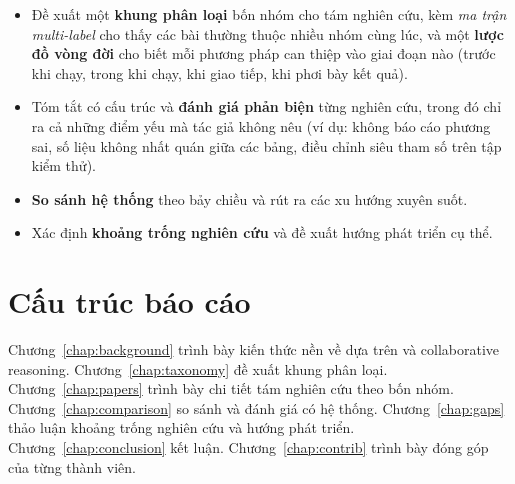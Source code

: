 \begin{itemize}
  \item Đề xuất một \textbf{khung phân loại} bốn nhóm cho tám nghiên cứu, kèm \emph{ma trận multi-label} cho thấy các bài thường thuộc nhiều nhóm cùng lúc, và một \textbf{lược đồ vòng đời} \MAS{} cho biết mỗi phương pháp can thiệp vào giai đoạn nào (trước khi chạy, trong khi chạy, khi giao tiếp, khi phơi bày kết quả).
  \item Tóm tắt có cấu trúc và \textbf{đánh giá phản biện} từng nghiên cứu, trong đó chỉ ra cả những điểm yếu mà tác giả không nêu (ví dụ: không báo cáo phương sai, số liệu không nhất quán giữa các bảng, điều chỉnh siêu tham số trên tập kiểm thử).
  \item \textbf{So sánh hệ thống} theo bảy chiều và rút ra các xu hướng xuyên suốt.
  \item Xác định \textbf{khoảng trống nghiên cứu} và đề xuất hướng phát triển cụ thể.
\end{itemize}

\section{Cấu trúc báo cáo}

Chương~\ref{chap:background} trình bày kiến thức nền về \MAS{} dựa trên \LLM{} và collaborative reasoning. Chương~\ref{chap:taxonomy} đề xuất khung phân loại. Chương~\ref{chap:papers} trình bày chi tiết tám nghiên cứu theo bốn nhóm. Chương~\ref{chap:comparison} so sánh và đánh giá có hệ thống. Chương~\ref{chap:gaps} thảo luận khoảng trống nghiên cứu và hướng phát triển. Chương~\ref{chap:conclusion} kết luận. Chương~\ref{chap:contrib} trình bày đóng góp của từng thành viên.
